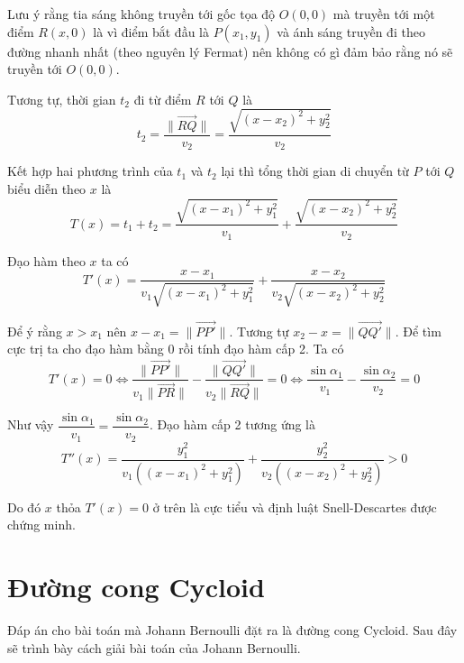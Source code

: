 \documentclass{mynotes}
\theoremstyle{definition}
\begin{document}
Lưu ý rằng tia sáng không truyền tới gốc tọa độ $O(0,0)$ mà truyền tới một điểm $R(x,0)$ là vì điểm bắt đầu là $P(x_1, y_1)$ và ánh sáng truyền đi theo đường nhanh nhất (theo nguyên lý Fermat) nên không có gì đảm bảo rằng nó sẽ truyền tới $O(0, 0)$.

Tương tự, thời gian $t_2$ đi từ điểm $R$ tới $Q$ là
\begin{equation}
    t_2 = \frac{\lVert \overrightarrow{RQ} \rVert}{v_2} = \frac{\sqrt{(x - x_2)^2 + y_2^2}}{v_2}
\end{equation}

Kết hợp hai phương trình của $t_1$ và $t_2$ lại thì tổng thời gian di chuyển từ $P$ tới $Q$ biểu diễn theo $x$ là
\begin{equation}
    T(x) = t_1 + t_2 = \frac{\sqrt{(x - x_1)^2 + y_1^2}}{v_1} + \frac{\sqrt{(x - x_2)^2 + y_2^2}}{v_2}
\end{equation}

Đạo hàm theo $x$ ta có
\begin{equation}
    T'(x) = \frac{x - x_1}{v_1 \sqrt{(x - x_1)^2 + y_1^2}} + \frac{x - x_2}{v_2 \sqrt{(x - x_2)^2 + y_2^2}}
\end{equation}

Để ý rằng $x > x_1$ nên $x - x_1 = \lVert \overrightarrow{PP'} \rVert$. Tương tự $x_2 - x = \lVert \overrightarrow{QQ'} \rVert$. Để tìm cực trị ta cho đạo hàm bằng 0 rồi tính đạo hàm cấp 2. Ta có
\begin{equation*}
    T'(x) = 0 \Leftrightarrow \frac{\lVert \overrightarrow{PP'} \rVert}{v_1 \lVert \overrightarrow{PR} \rVert} - \frac{\lVert \overrightarrow{QQ'} \rVert}{v_2 \lVert \overrightarrow{RQ} \rVert} = 0 \Leftrightarrow \frac{\sin \alpha_1}{v_1} - \frac{\sin \alpha_2}{v_2} = 0
\end{equation*}

Như vậy $\dfrac{\sin \alpha_1}{v_1} = \dfrac{\sin \alpha_2}{v_2}$. Đạo hàm cấp 2 tương ứng là
\begin{equation*}
    T''(x) = \frac{y_1^2}{v_1 ((x - x_1)^2 + y_1^2)} + \frac{y_2^2}{v_2 ((x - x_2)^2 + y_2^2)} > 0
\end{equation*}

Do đó $x$ thỏa $T'(x) = 0$ ở trên là cực tiểu và định luật Snell-Descartes được chứng minh.

\section*{Đường cong Cycloid}

Đáp án cho bài toán mà Johann Bernoulli đặt ra là đường cong Cycloid. Sau đây sẽ trình bày cách giải bài toán của Johann Bernoulli.
\end{document}
